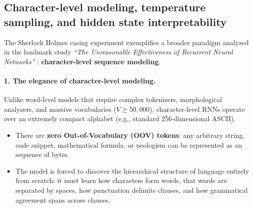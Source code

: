\documentclass[../../main.tex]{subfiles}
\begin{document}
\subsection{Character-level modeling, temperature sampling, and hidden state interpretability}
\label{sec:karpathy_char_rnn}

The Sherlock Holmes casing experiment exemplifies a broader paradigm analyzed in the landmark study \emph{``The Unreasonable Effectiveness of Recurrent Neural Networks''} \cite{karpathy2015rnn}: \textbf{character-level sequence modeling}.

\paragraph{1. The elegance of character-level modeling.}
Unlike word-level models that require complex tokenizers, morphological analyzers, and massive vocabularies ($V \ge 50{,}000$), character-level RNNs operate over an extremely compact alphabet (e.g., standard 256-dimensional ASCII). 
\begin{itemize}
    \item There are \textbf{zero Out-of-Vocabulary (OOV) tokens}: any arbitrary string, code snippet, mathematical formula, or neologism can be represented as an sequence of bytes.
    \item The model is forced to discover the hierarchical structure of language entirely from scratch: it must learn how characters form words, that words are separated by spaces, how punctuation delimits clauses, and how grammatical agreement spans across clauses.
\end{itemize}
\end{document}
